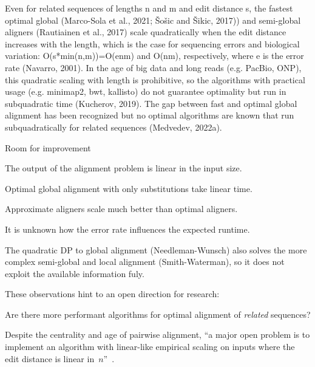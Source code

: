 Even for related sequences of lengths n and m and edit distance s, the fastest
optimal global (Marco-Sola et al., 2021; Šošic and Šikic, 2017)) and semi-global
aligners (Rautiainen et al., 2017) scale quadratically when the edit distance
increases with the length, which is the case for sequencing errors and
biological variation: O(s*min(n,m))=O(enm) and O(nm), respectively, where e is
the error rate (Navarro, 2001). In the age of big data and long reads (e.g.
PacBio, ONP), this quadratic scaling with length is prohibitive, so the
algorithms with practical usage (e.g. minimap2, bwt, kallisto) do not guarantee
optimality but run in subquadratic time (Kucherov, 2019). The gap between fast
and optimal global alignment has been recognized but no optimal algorithms are
known that run subquadratically for related sequences (Medvedev, 2022a).

Room for improvement

\begin{observation}
    The output of the alignment problem is linear in the input size.
\end{observation}

\begin{observation}
    Optimal global alignment with only substitutions take linear time.
\end{observation}

\begin{observation}
    Approximate aligners scale much better than optimal aligners.
\end{observation}

It is unknown how the error rate influences the expected runtime.

\begin{observation}
    The quadratic DP to global alignment (Needleman-Wunsch) also solves the more
    complex semi-global and local alignment (Smith-Waterman), so it does not
    exploit the available information fuly.
\end{observation}

These observations hint to an open direction for research:

\begin{problem}
    Are there more performant algorithms for optimal alignment of \emph{related}
    sequences?
\end{problem}

Despite the centrality and age of pairwise alignment, ``a major open problem is
to implement an algorithm with linear-like empirical scaling on inputs where the
edit distance is linear in~$n$''~\citep{medvedev2022theoretical}.

